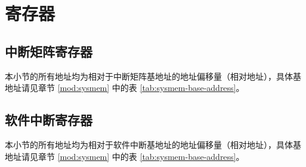 \documentclass[main\_\_CN.tex]{subfiles}
\begin{document}


\newpage
\section{寄存器}

\subsection{中断矩阵寄存器}

本小节的所有地址均为相对于中断矩阵基地址的地址偏移量（相对地址），具体基地址请见章节 \ref{mod:sysmem} \textit{} 中的表 \ref{tab:sysmem-base-address}。



\subsection{软件中断寄存器}
\label{sec:intpri-reg}

本小节的所有地址均为相对于软件中断基地址的地址偏移量（相对地址），具体基地址请见章节 \ref{mod:sysmem} \textit{} 中的表 \ref{tab:sysmem-base-address}。


\end{document}
